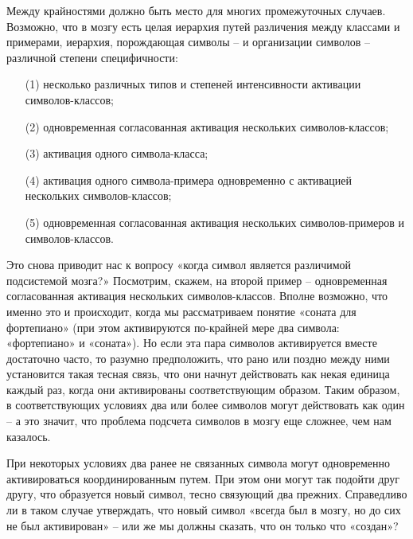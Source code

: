 \documentclass[../main.tex]{subfiles}
\begin{document}
Между крайностями должно быть место для многих промежуточных случаев. Возможно, что в мозгу есть целая иерархия путей различения между классами и примерами, иерархия, порождающая символы \--- и организации символов \--- различной степени специфичности:

\begin{itemize}[label={}, noitemsep, topsep=6pt]
    \item[(1)] несколько различных типов и степеней интенсивности активации символов-классов;
    \item[(2)] одновременная согласованная активация нескольких символов-классов;
    \item[(3)] активация одного символа-класса;
    \item[(4)] активация одного символа-примера одновременно с активацией нескольких символов-классов;
    \item[(5)] одновременная согласованная активация нескольких символов-примеров и символов-классов.
\end{itemize}

Это снова приводит нас к вопросу «когда символ является различимой подсистемой мозга?» Посмотрим, скажем, на второй пример \--- одновременная согласованная активация нескольких символов-классов. Вполне возможно, что именно это и происходит, когда мы рассматриваем понятие «соната для фортепиано» (при этом активируются по-крайней мере два символа: «фортепиано» и «соната»). Но если эта пара символов активируется вместе достаточно часто, то разумно предположить, что рано или поздно между ними установится такая тесная связь, что они начнут действовать как некая единица каждый раз, когда они активированы соответствующим образом. Таким образом, в соответствующих условиях два или более символов могут действовать как один \--- а это значит, что проблема подсчета символов в мозгу еще сложнее, чем нам казалось.

При некоторых условиях два ранее не связанных символа могут одновременно активироваться координированным путем. При этом они могут так подойти друг другу, что образуется новый символ, тесно связующий два прежних. Справедливо ли в таком случае утверждать, что новый символ «всегда был в мозгу, но до сих не был активирован» \--- или же мы должны сказать, что он только что «создан»?
\end{document}
